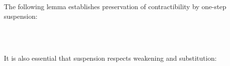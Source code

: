 \begin{code}\>\<%
\\
\> \<[5]%
\>[5]\AgdaSymbol{:} \AgdaSymbol{\}\{} \AgdaSymbol{:}  \AgdaSymbol{\}}      \AgdaSymbol{(} \AgdaSymbol{)}\<%
\\
\> \<[5]%
\>[5]\AgdaSymbol{:} \AgdaSymbol{\}\{} \AgdaSymbol{:}  \AgdaSymbol{\}}      \AgdaSymbol{(} \AgdaSymbol{)}\<%
\\
\> \<[5]%
\>[5]\AgdaSymbol{:}  \AgdaSymbol{\}}          \<%
\\
\>\<\end{code}
\noindent The following lemma establishes preservation of contractibility by
one-step suspension:

\begin{code}\>\<%
\\
\> \AgdaSymbol{:}        \AgdaSymbol{(} \AgdaSymbol{)}\<%
\\
\>\<\end{code}
\noindent It is also essential that suspension respects weakening and substitution:

